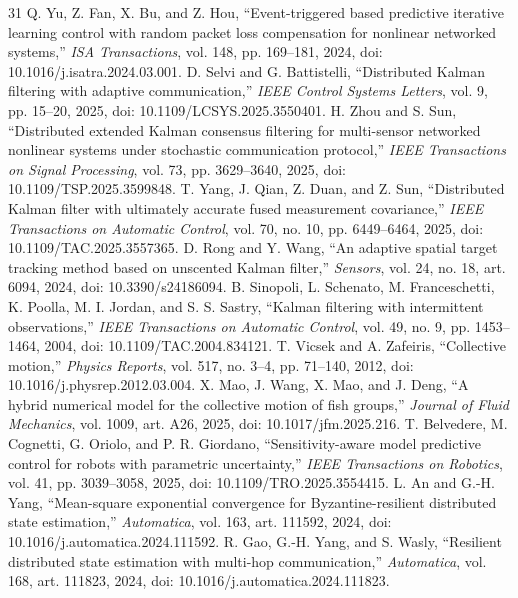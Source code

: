 \documentclass[UTF8,fontset=windows,11pt]{ctexart}
\begin{document}
\begin{thebibliography}{31}
 Q. Yu, Z. Fan, X. Bu, and Z. Hou, ``Event-triggered based predictive iterative learning control with random packet loss compensation for nonlinear networked systems,'' \emph{ISA Transactions}, vol. 148, pp. 169--181, 2024, doi: 10.1016/j.isatra.2024.03.001.
 D. Selvi and G. Battistelli, ``Distributed Kalman filtering with adaptive communication,'' \emph{IEEE Control Systems Letters}, vol. 9, pp. 15--20, 2025, doi: 10.1109/LCSYS.2025.3550401.
 H. Zhou and S. Sun, ``Distributed extended Kalman consensus filtering for multi-sensor networked nonlinear systems under stochastic communication protocol,'' \emph{IEEE Transactions on Signal Processing}, vol. 73, pp. 3629--3640, 2025, doi: 10.1109/TSP.2025.3599848.
 T. Yang, J. Qian, Z. Duan, and Z. Sun, ``Distributed Kalman filter with ultimately accurate fused measurement covariance,'' \emph{IEEE Transactions on Automatic Control}, vol. 70, no. 10, pp. 6449--6464, 2025, doi: 10.1109/TAC.2025.3557365.
 D. Rong and Y. Wang, ``An adaptive spatial target tracking method based on unscented Kalman filter,'' \emph{Sensors}, vol. 24, no. 18, art. 6094, 2024, doi: 10.3390/s24186094.
 B. Sinopoli, L. Schenato, M. Franceschetti, K. Poolla, M. I. Jordan, and S. S. Sastry, ``Kalman filtering with intermittent observations,'' \emph{IEEE Transactions on Automatic Control}, vol. 49, no. 9, pp. 1453--1464, 2004, doi: 10.1109/TAC.2004.834121.
 T. Vicsek and A. Zafeiris, ``Collective motion,'' \emph{Physics Reports}, vol. 517, no. 3--4, pp. 71--140, 2012, doi: 10.1016/j.physrep.2012.03.004.
 X. Mao, J. Wang, X. Mao, and J. Deng, ``A hybrid numerical model for the collective motion of fish groups,'' \emph{Journal of Fluid Mechanics}, vol. 1009, art. A26, 2025, doi: 10.1017/jfm.2025.216.
 T. Belvedere, M. Cognetti, G. Oriolo, and P. R. Giordano, ``Sensitivity-aware model predictive control for robots with parametric uncertainty,'' \emph{IEEE Transactions on Robotics}, vol. 41, pp. 3039--3058, 2025, doi: 10.1109/TRO.2025.3554415.
 L. An and G.-H. Yang, ``Mean-square exponential convergence for Byzantine-resilient distributed state estimation,'' \emph{Automatica}, vol. 163, art. 111592, 2024, doi: 10.1016/j.automatica.2024.111592.
 R. Gao, G.-H. Yang, and S. Wasly, ``Resilient distributed state estimation with multi-hop communication,'' \emph{Automatica}, vol. 168, art. 111823, 2024, doi: 10.1016/j.automatica.2024.111823.
\end{thebibliography}
\end{document}
